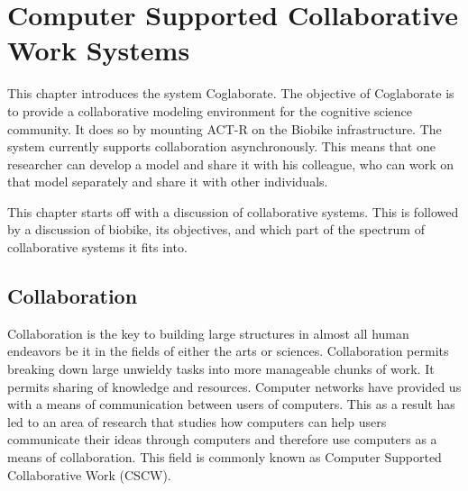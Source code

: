 
\chapter{Computer Supported Collaborative Work Systems}
\label{chap-four}


This chapter introduces the system Coglaborate.
%
The objective of Coglaborate is to provide a collaborative modeling
environment for the cognitive science community. It does so by
mounting ACT-R on the Biobike infrastructure. The system currently
supports collaboration asynchronously. This means that one researcher
can develop a model and share it with his colleague, who can work on
that model separately and share it with other individuals.


This chapter starts off with a discussion of collaborative
systems. This is followed by a discussion of biobike, its objectives,
and which part of the spectrum of collaborative systems it fits
into.

\section{Collaboration}
Collaboration is the key to building large structures in almost all
human endeavors be it in the fields of either the arts or
sciences. Collaboration permits breaking down large unwieldy tasks
into more manageable chunks of work. It permits sharing of knowledge
and resources. Computer networks have provided us with a means of
communication between users of computers. This as a result has led to
an area of research that studies how computers can help users
communicate their ideas through computers and therefore use computers
as a means of collaboration.  This field is commonly known as Computer
Supported Collaborative Work (CSCW).

